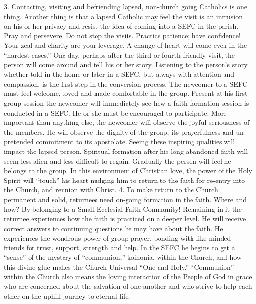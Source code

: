 \documentclass[oneside]{book}
\begin{document}
3. Contacting, visiting and befriending lapsed, non-church going Catholics is
one thing. Another thing is that a lapsed Catholic may feel the visit is an
intrusion on his or her privacy and resist the idea of coming into a SEFC in the
parish. Pray and persevere. Do not stop the visits. Practice patience; have
confidence! Your zeal and charity are your leverage. A change of heart will come
even in the ``hardest cases.'' One day, perhaps after the third or fourth
friendly visit, the person will come around and tell his or her story. Listening
to the person's story whether told in the home or later in a SEFC, but always
with attention and compassion, is the first step in the conversion process. The
newcomer to a SEFC must feel welcome, loved and made comfortable in the
group. Present at his first group session the newcomer will immediately see how
a faith formation session is conducted in a SEFC. He or she must be encouraged
to participate.
More important than anything else, the newcomer will observe the joyful
seriousness of the members. He will observe the dignity of the group, its
prayerfulness and un-pretended commitment to its apostolate. Seeing these
inspiring qualities will impact the lapsed person. Spiritual formation after his
long abandoned faith will seem less alien and less difficult to
regain. Gradually the person will feel he belongs to the group. In this
environment of Christian love, the power of the Holy Spirit will ``touch'' his
heart nudging him to return to the faith for re-entry into the Church, and
reunion with Christ.
4. To make return to the Church permanent and solid, returnees need on-going
formation in the faith. Where and how? By belonging to a Small Ecclesial Faith
Community! Remaining in it the returnee experiences how the faith is practiced
on a deeper level. He will receive correct answers to continuing questions he
may have about the faith. He experiences the wondrous power of group prayer,
bonding with like-minded friends for trust, support, strength and help. In the
SEFC he begins to get a ``sense'' of the mystery of ``communion,'' koinonia,
within the Church, and how this divine glue makes the Church Universal ``One and
Holy.'' ``Communion'' within the Church also means the loving interaction of the
People of God in grace who are concerned about the salvation of one another and
who strive to help each other on the uphill journey to eternal life.
\end{document}
